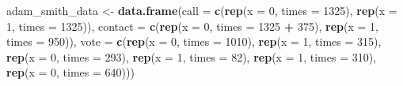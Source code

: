 \documentclass[12pt,leqno]{article}
\newenvironment{Shaded}{\begin{snugshade}}{\end{snugshade}}
\newcommand{\DataTypeTok}[1]{\textcolor[rgb]{0.13,0.29,0.53}{#1}}
\newcommand{\DecValTok}[1]{\textcolor[rgb]{0.00,0.00,0.81}{#1}}
\newcommand{\KeywordTok}[1]{\textcolor[rgb]{0.13,0.29,0.53}{\textbf{#1}}}
\newcommand{\NormalTok}[1]{#1}
\newcommand{\OperatorTok}[1]{\textcolor[rgb]{0.81,0.36,0.00}{\textbf{#1}}}
\newcommand{\StringTok}[1]{\textcolor[rgb]{0.31,0.60,0.02}{#1}}
\theoremstyle{newstyle}
\begin{document}
\begin{Shaded}
\begin{Highlighting}[]
\NormalTok{adam_smith_data <-}\StringTok{ }\KeywordTok{data.frame}\NormalTok{(}\DataTypeTok{call =} \KeywordTok{c}\NormalTok{(}\KeywordTok{rep}\NormalTok{(}\DataTypeTok{x =} \DecValTok{0}\NormalTok{, }\DataTypeTok{times =} \DecValTok{1325}\NormalTok{), }\KeywordTok{rep}\NormalTok{(}\DataTypeTok{x =} \DecValTok{1}\NormalTok{, }\DataTypeTok{times =} \DecValTok{1325}\NormalTok{)),}
                              \DataTypeTok{contact =} \KeywordTok{c}\NormalTok{(}\KeywordTok{rep}\NormalTok{(}\DataTypeTok{x =} \DecValTok{0}\NormalTok{, }\DataTypeTok{times =} \DecValTok{1325} \OperatorTok{+}\StringTok{ }\DecValTok{375}\NormalTok{), }\KeywordTok{rep}\NormalTok{(}\DataTypeTok{x =} \DecValTok{1}\NormalTok{, }\DataTypeTok{times =} \DecValTok{950}\NormalTok{)),}
                              \DataTypeTok{vote =} \KeywordTok{c}\NormalTok{(}\KeywordTok{rep}\NormalTok{(}\DataTypeTok{x =} \DecValTok{0}\NormalTok{, }\DataTypeTok{times =} \DecValTok{1010}\NormalTok{), }\KeywordTok{rep}\NormalTok{(}\DataTypeTok{x =} \DecValTok{1}\NormalTok{, }\DataTypeTok{times =} \DecValTok{315}\NormalTok{),}
                                       \KeywordTok{rep}\NormalTok{(}\DataTypeTok{x =} \DecValTok{0}\NormalTok{, }\DataTypeTok{times =} \DecValTok{293}\NormalTok{), }\KeywordTok{rep}\NormalTok{(}\DataTypeTok{x =} \DecValTok{1}\NormalTok{, }\DataTypeTok{times =} \DecValTok{82}\NormalTok{),}
                                       \KeywordTok{rep}\NormalTok{(}\DataTypeTok{x =} \DecValTok{1}\NormalTok{, }\DataTypeTok{times =} \DecValTok{310}\NormalTok{), }\KeywordTok{rep}\NormalTok{(}\DataTypeTok{x =} \DecValTok{0}\NormalTok{, }\DataTypeTok{times =} \DecValTok{640}\NormalTok{)))}
\end{Highlighting}
\end{Shaded}

\newpage
\singlespacing 

\end{document}
